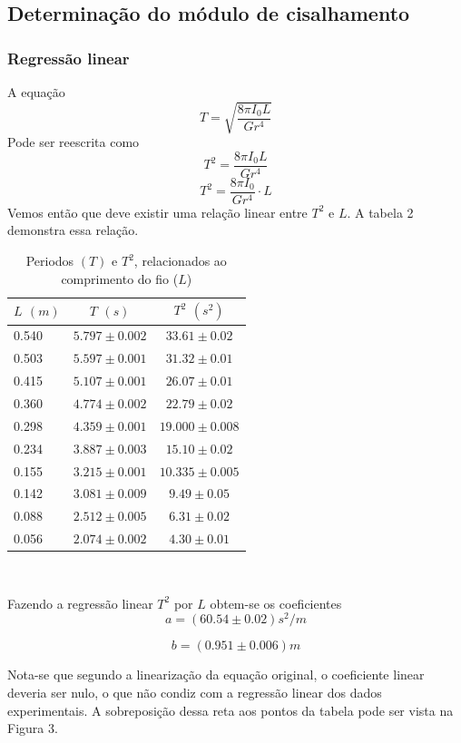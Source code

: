 \documentclass[12pt,a4paper]{article}
\begin{document}
\subsection{Determinação do módulo de cisalhamento}
\subsubsection{Regressão linear}
A equação 
$$ T = \sqrt{\frac{8\pi I_0 L}{G r^4}} $$
Pode ser reescrita como 
$$ T^2 = \frac{8\pi I_0 L}{G r^4} $$
$$ T^2 = \frac{8\pi I_0}{G r^4} \cdot L $$
Vemos então que deve existir uma relação linear entre $T^2$ e $L$. A tabela 2 demonstra essa relação.

\begin{table}[!htbp]
\centering
\def\arraystretch{1.3}
\caption{Periodos $(T)$ e $T^2$, relacionados ao comprimento do fio ($L$)} 
\label{Resultados}
\begin{tabular}{|l|c|c|}
\hline
$L$ $(m)$ & $T$ $(s)$ & $T^2$ $(s^2)$ \\
\hline 
0.540 & $5.797 \pm 0.002$ & $33.61 \pm 0.02 $ \\
\hline 
0.503 & $5.597 \pm 0.001$ & $31.32 \pm 0.01 $ \\
\hline 
0.415 & $5.107 \pm 0.001$ & $26.07 \pm 0.01 $ \\
\hline 
0.360 & $4.774 \pm 0.002$ & $22.79 \pm 0.02 $ \\
\hline
0.298 & $4.359 \pm 0.001$ & $19.000 \pm 0.008 $ \\
\hline
0.234 & $3.887 \pm 0.003$ & $15.10 \pm 0.02 $ \\
\hline
0.155 & $3.215 \pm 0.001$ & $10.335 \pm 0.005 $ \\
\hline 
0.142 & $3.081 \pm 0.009$ & $9.49 \pm 0.05 $ \\
\hline 
0.088 & $2.512 \pm 0.005$ & $6.31 \pm 0.02 $ \\
\hline 
0.056 & $2.074 \pm 0.002$ & $4.30 \pm 0.01 $ \\
\hline 


\end{tabular} \\

\end{table}

Fazendo a regressão linear $T^2$ por $L$ obtem-se os coeficientes
$$ a = (60.54 \pm 0.02) s^2/m $$

$$ b = (0.951 \pm 0.006) m $$

Nota-se que segundo a linearização da equação original, o coeficiente linear deveria ser nulo, o que não condiz com a regressão linear dos dados experimentais. A sobreposição dessa reta aos pontos da tabela pode ser vista na Figura 3.
\end{document}
